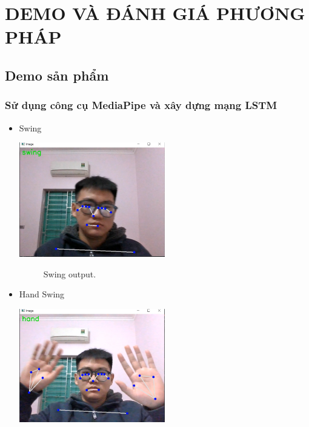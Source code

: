 
\chapter{DEMO VÀ ĐÁNH GIÁ PHƯƠNG PHÁP} 

\label{Chapter4}

\section{Demo sản phẩm}



\subsection{Sử dụng công cụ MediaPipe và xây dựng mạng LSTM}
\begin{itemize}
    \item Swing
    
        \includegraphics[width=0.5\textwidth]{Figures/swing.PNG}
        \begin{figure}[h!]
    	\centering
    	\caption[Swing output .]{Swing output.}
    	\label{bia_conv.png} 
        \end{figure}
    \item Hand Swing

        \includegraphics[width=0.5\textwidth]{Figures/hand.PNG}
        \begin{figure}[h!]
    	\centering
    	

\end{figure}
\end{itemize}
